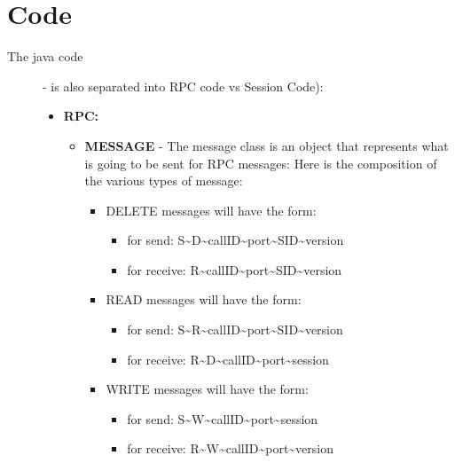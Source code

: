 \documentclass{article}
\begin{document}
\section{Code}
  \begin{description}
    \item[The java code] - is also separated into RPC code vs Session Code):
      \begin{itemize}
        \item \textbf{RPC:}
          \begin{itemize}
            \item \textbf{MESSAGE} - The message class is an object that represents what is going to be sent for RPC messages: Here is the composition of the various types of message:\\
              \begin{itemize}
                \item DELETE messages will have the form: 
                  \begin{itemize}
                    \item for send: S\textasciitilde{}D\textasciitilde{}callID\textasciitilde{}port\textasciitilde{}SID\textasciitilde{}version  
                    \item for receive: R\textasciitilde{}callID\textasciitilde{}port\textasciitilde{}SID\textasciitilde{}version 
                  \end{itemize}
                \item READ messages will have the form: 
                  \begin{itemize}
                    \item for send: S\textasciitilde{}R\textasciitilde{}callID\textasciitilde{}port\textasciitilde{}SID\textasciitilde{}version 
                    \item for receive: R\textasciitilde{}D\textasciitilde{}callID\textasciitilde{}port\textasciitilde{}session 
                  \end{itemize}
                \item WRITE messages will have the form: 
                  \begin{itemize}
                    \item for send: S\textasciitilde{}W\textasciitilde{}callID\textasciitilde{}port\textasciitilde{}session
                    \item for receive: R\textasciitilde{}W\textasciitilde{}callID\textasciitilde{}port\textasciitilde{}version
                  \end{itemize}

\end{itemize}
\end{itemize}
\end{itemize}
\end{description}
\end{document}
